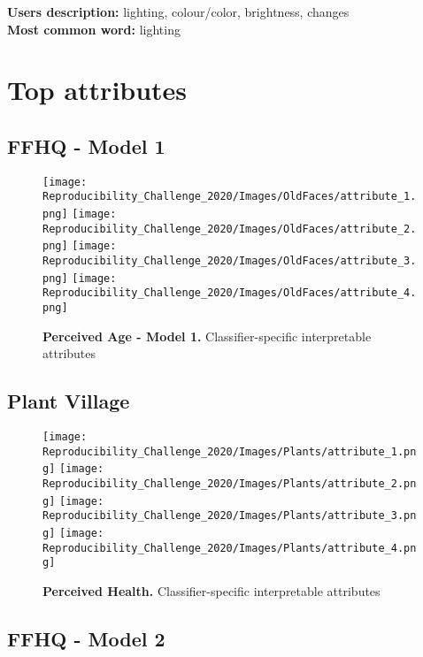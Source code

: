 \textbf{Users description:} lighting, colour/color, brightness, changes \\
\textbf{Most common word:} lighting


\newpage
\section{Top attributes}\label{appendix:top attributes}

\subsection{FFHQ - Model 1}
\begin{figure}[hbt!]
  \texttt{[image: Reproducibility\_Challenge\_2020/Images/OldFaces/attribute\_1.png]}
\endminipage\hfill
{}
  \texttt{[image: Reproducibility\_Challenge\_2020/Images/OldFaces/attribute\_2.png]}
\endminipage\hfill
{}
  \texttt{[image: Reproducibility\_Challenge\_2020/Images/OldFaces/attribute\_3.png]}
\endminipage\hfill
{}
  \texttt{[image: Reproducibility\_Challenge\_2020/Images/OldFaces/attribute\_4.png]}
\endminipage\hfill
\caption{\textbf{Perceived Age - Model 1.} Classifier-specific interpretable attributes}
\label{fig: introduction}
\end{figure}


\newpage
\subsection{Plant Village}

\begin{figure}[hbt!]
  \texttt{[image: Reproducibility\_Challenge\_2020/Images/Plants/attribute\_1.png]}
\endminipage\hfill
{}
  \texttt{[image: Reproducibility\_Challenge\_2020/Images/Plants/attribute\_2.png]}
\endminipage\hfill
{}
  \texttt{[image: Reproducibility\_Challenge\_2020/Images/Plants/attribute\_3.png]}
\endminipage\hfill
{}
  \texttt{[image: Reproducibility\_Challenge\_2020/Images/Plants/attribute\_4.png]}
\endminipage\hfill
\caption{\textbf{Perceived Health.} Classifier-specific interpretable attributes}
\label{fig: introduction}
\end{figure}


\newpage
\subsection{FFHQ - Model 2}

